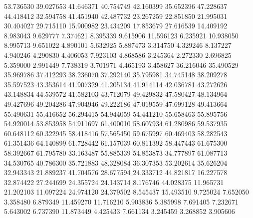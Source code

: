 53.736530
39.027653
41.646371
40.754749
42.160399
35.652396
47.228637
44.418412
32.594758
41.451940
42.487732
23.267259
22.851850
21.995031
30.404027
29.715110
15.900982
23.434209
17.853679
27.616539
14.409192
8.983043
9.629777
7.374621
8.395339
9.615906
11.596123
6.235921
10.938050
8.995713
9.651022
4.890101
5.632925
5.887473
3.314750
4.329246
8.137227
4.940246
4.290830
4.406053
7.923103
4.868586
3.245364
2.272330
2.696825
5.359000
2.991449
7.738319
3.701971
4.465193
3.458627
36.216046
35.490529
35.969786
37.412293
38.236070
37.292140
35.795981
34.745148
38.209278
35.597523
43.353614
41.907329
41.205134
41.914114
42.036781
43.272626
43.148834
44.539572
41.582103
43.712079
49.429832
47.580427
48.134964
49.427696
49.204286
47.904946
49.222186
47.019559
47.699128
49.413664
55.490631
55.416652
56.294415
54.944059
54.441210
55.658463
55.895756
54.920014
53.853958
54.911697
61.400010
58.607934
61.280986
59.537935
60.648112
60.322945
58.418416
57.565450
59.675997
60.469403
58.282543
61.351436
64.140899
61.728442
61.157039
60.811392
58.447443
61.675300
58.392667
61.795780
33.163487
55.885339
54.853873
34.777897
61.087713
34.530765
40.786300
35.721883
48.328084
36.307353
53.202614
35.626204
32.943343
21.889237
41.704576
28.677594
24.333712
44.821817
16.227578
32.874422
27.244699
24.355724
24.143714
8.176746
44.028375
11.965731
21.202103
11.097224
24.974120
24.379502
8.545437
15.493510
9.725024
7.652050
3.358480
6.879349
11.459270
11.716210
5.903836
5.385998
7.691405
7.232671
5.643002
6.737390
11.873449
4.425433
7.661134
3.245459
3.268852
3.905606

